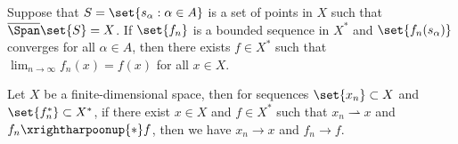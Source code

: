 \documentclass[12pt,letterpaper,twoside]{hmcpset}
\begin{document}
\begin{problem}[6]
  Suppose that $S = \set{s_{\alpha} : \alpha \in A}$ is a set of points in $X$ such that $\overline{\Span}\set{S} = X$.
  If $\set{f_{n}}$ is a bounded sequence in $X^{*}$ and $\set{f_{n}(s_{\alpha})}$ converges for all $\alpha \in A$, then there exists $f \in X^{*}$ such that $\lim_{n\to\infty} f_{n}(x) = f(x)$ for all $x\in X$.
\end{problem}

\begin{problem}[7]
  Let $X$ be a finite-dimensional space, then for sequences $\set{x_{n}} \subset X$ and $\set{f_{n}^{*}} \subset X^{*}$, if there exist $x \in X$ and $f \in X^{*}$ such that $x_{n} \rightharpoonup x$ and $f_{n} \xrightharpoonup{*} f$, then we have $x_{n} \to x$ and $f_{n} \to f$.
\end{problem}
\end{document}
